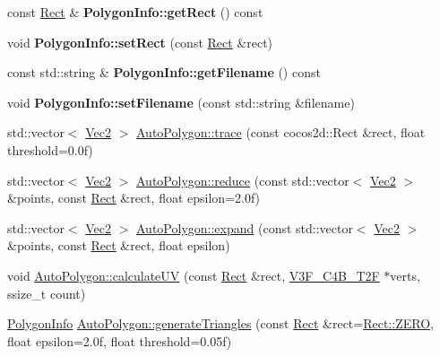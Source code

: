 \begin{DoxyCompactItemize}
\item 
\mbox{\label{group____2d_ga30cef532a9cc895d1b380b4149fb6e81}} 
const \hyperlink{classRect}{Rect} \& {\bfseries Polygon\+Info\+::get\+Rect} () const
\item 
\mbox{\label{group____2d_ga84c40eea3f784db0db67d77d0a051777}} 
void {\bfseries Polygon\+Info\+::set\+Rect} (const \hyperlink{classRect}{Rect} \&rect)
\item 
\mbox{\label{group____2d_ga12bc45d3989ba681914229b9138f46aa}} 
const std\+::string \& {\bfseries Polygon\+Info\+::get\+Filename} () const
\item 
\mbox{\label{group____2d_gaeb5c9c287d4fe93fd3426dcd94b97995}} 
void {\bfseries Polygon\+Info\+::set\+Filename} (const std\+::string \&filename)
\item 
std\+::vector$<$ \hyperlink{classVec2}{Vec2} $>$ \hyperlink{group____2d_gaac8f745760eabe0b1bfeff151b84f1f3}{Auto\+Polygon\+::trace} (const cocos2d\+::\+Rect \&rect, float threshold=0.\+0f)
\item 
std\+::vector$<$ \hyperlink{classVec2}{Vec2} $>$ \hyperlink{group____2d_ga0dc5100249481cd749cb692f6986cec0}{Auto\+Polygon\+::reduce} (const std\+::vector$<$ \hyperlink{classVec2}{Vec2} $>$ \&points, const \hyperlink{classRect}{Rect} \&rect, float epsilon=2.\+0f)
\item 
std\+::vector$<$ \hyperlink{classVec2}{Vec2} $>$ \hyperlink{group____2d_gab3d27e5dc8a0078f98b43db486b4a89f}{Auto\+Polygon\+::expand} (const std\+::vector$<$ \hyperlink{classVec2}{Vec2} $>$ \&points, const \hyperlink{classRect}{Rect} \&rect, float epsilon)
\item 
void \hyperlink{group____2d_gaa52f7459e5e90aaa2192a813dba5c699}{Auto\+Polygon\+::calculate\+UV} (const \hyperlink{classRect}{Rect} \&rect, \hyperlink{structV3F__C4B__T2F}{V3\+F\+\_\+\+C4\+B\+\_\+\+T2F} $\ast$verts, ssize\+\_\+t count)
\item 
\hyperlink{classPolygonInfo}{Polygon\+Info} \hyperlink{group____2d_gaf6a1f4dad82ff92fe6b5d26bea05f42a}{Auto\+Polygon\+::generate\+Triangles} (const \hyperlink{classRect}{Rect} \&rect=\hyperlink{classRect_a590be46e60027b2ca0f62a457f91a83e}{Rect\+::\+Z\+E\+RO}, float epsilon=2.\+0f, float threshold=0.\+05f)
\item 
\mbox{\label{group____2d_ga4bb97d6a47930f3ad07e33a29267ddbf}} 

\end{DoxyCompactItemize}
